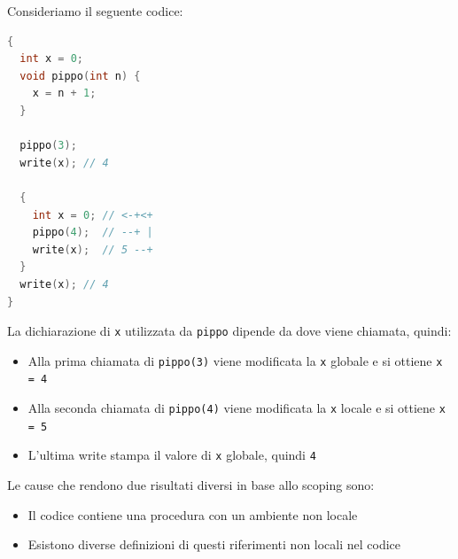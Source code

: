 \documentclass[a4paper]{article}
\begin{document}
\begin{Example}{}{}
  Consideriamo il seguente codice:
\begin{lstlisting}[language=C]
{
  int x = 0;
  void pippo(int n) {
    x = n + 1;
  }

  pippo(3);
  write(x); // 4

  {
    int x = 0; // <-+<+
    pippo(4);  // --+ |
    write(x);  // 5 --+
  }
  write(x); // 4
}
\end{lstlisting}
  La dichiarazione di \texttt{x} utilizzata da \texttt{pippo} dipende da dove viene
  chiamata, quindi:
  \begin{itemize}
    \item Alla prima chiamata di \texttt{pippo(3)} viene modificata la \texttt{x} globale
      e si ottiene \texttt{x = 4}

    \item Alla seconda chiamata di \texttt{pippo(4)} viene modificata la \texttt{x} locale
      e si ottiene \texttt{x = 5}

    \item L'ultima write stampa il valore di \texttt{x} globale, quindi \texttt{4}
  \end{itemize}
\end{Example}
\noindent
Le cause che rendono due risultati diversi in base allo scoping sono:
\begin{itemize}
  \item Il codice contiene una procedura con un ambiente non locale
  \item Esistono diverse definizioni di questi riferimenti non locali nel
    codice
\end{itemize}
\end{document}
